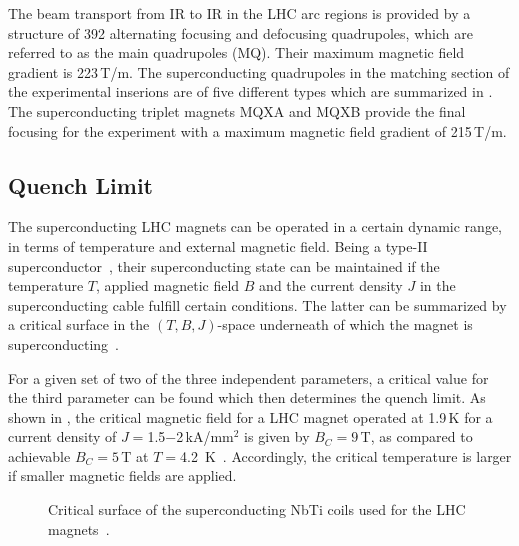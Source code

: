 The beam transport from IR to IR in the LHC arc regions is provided by a structure of 392 alternating focusing and defocusing quadrupoles, which are referred to as the main quadrupoles (MQ). Their maximum magnetic field gradient is 223\,T/m. The superconducting quadrupoles in the matching section of the experimental inserions are of five different types which are summarized in \citedr. The superconducting triplet magnets MQXA and MQXB provide the final focusing for the experiment with a maximum magnetic field gradient of 215\,T/m. 


\subsection{Quench Limit} \label{chap:quenchlim}

The superconducting LHC magnets can be operated in a certain dynamic range, in terms of temperature and external magnetic field. Being a type-II superconductor~\cite{tinkham1996introduction}, their superconducting state can be maintained if the temperature $T$, applied magnetic field $B$ and the current density $J$ in the superconducting cable fulfill certain conditions. The latter can be summarized by a critical surface in the $(T,B,J)$-space underneath of which the magnet is superconducting~\cite{iwasa09}. 

For a given set of two of the three independent parameters, a critical value for the third parameter can be found which then determines the quench limit. As shown in , the critical magnetic field for a LHC magnet operated at 1.9\,K for a current density of $J=$1.5$-$2\,kA/mm$^2$ is given by $B_C = 9\,$T, as compared to achievable $B_C=5\,$T at $T=$4.2~K~\cite{bruening:nature07}. Accordingly, the critical temperature is larger if smaller magnetic fields are applied.

\begin{figure}[b]
  \centering
  \caption{Critical surface of the superconducting NbTi coils used for the LHC magnets~\cite{courier2013_quench}.}  
  \label{pic:16070401}
  \end{figure}

